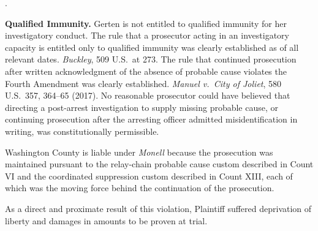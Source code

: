 \documentclass[12pt,letterpaper]{article}
\newcounter{complaintpara}
\newenvironment{paras}{%
	\begin{list}{\arabic{complaintpara}.}{%
			\setlength{\leftmargin}{0.5in}%
			\setlength{\labelwidth}{0.4in}%
			\setlength{\labelsep}{0.1in}%
			\setlength{\itemsep}{0pt}%
			\setlength{\parsep}{0pt}%
			\setlength{\topsep}{6pt}%
		}%
	}{%
	\end{list}%
}
\begin{document}
\begin{paras}
		\item \textbf{Qualified Immunity.} Gerten is not entitled to
		qualified immunity for her investigatory conduct. The rule
		that a prosecutor acting in an investigatory capacity is
		entitled only to qualified immunity was clearly established
		as of all relevant dates. \textit{Buckley}, 509 U.S.\ at 273.
		The rule that continued prosecution after written
		acknowledgment of the absence of probable cause violates the
		Fourth Amendment was clearly established.
		\textit{Manuel v.\ City of Joliet}, 580 U.S.\ 357, 364--65
		(2017). No reasonable prosecutor could have believed that
		directing a post-arrest investigation to supply missing
		probable cause, or continuing prosecution after the arresting
		officer admitted misidentification in writing, was
		constitutionally permissible.
		
		\item Washington County is liable under \textit{Monell} because
		the prosecution was maintained pursuant to the relay-chain
		probable cause custom described in Count VI and the
		coordinated suppression custom described in Count XIII, each
		of which was the moving force behind the continuation of
		the prosecution.
		
		\item As a direct and proximate result of this violation,
		Plaintiff suffered deprivation of liberty and damages in
		amounts to be proven at trial.
		
	\end{paras}
\end{document}
